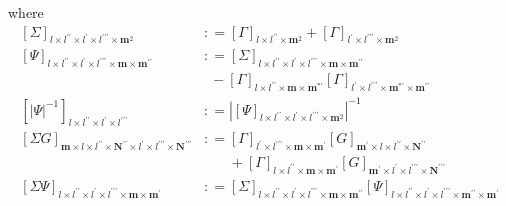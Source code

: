 \documentclass[preprint,12pt]{elsarticle}
\newcommand*{\M}[1]{\ensuremath{#1}\xspace}
\newcommand*{\x}{\times}
\newcommand*{\mi}[1]{\mathbf{#1}}
\newcommand*{\te}[2][]{\left\lbrack{#2}\right\rbrack_{#1}}
\newcommand*{\deq}{\M{\mathrel{\mathop:}=}}
\newcommand*{\modulus}[1]{\M{\left\lvert{#1}\right\rvert}}
\begin{document}
    where
    \begin{equation*}
        \begin{aligned}
            \te[l\x l^{\prime\prime}\x l^{\prime}\x l^{\prime\prime\prime}\x\mi{m}^{2}]{\Sigma} &\deq 
            \te[l\x l^{\prime\prime}\x\mi{m}^{2}]{\Gamma} + \te[l^{\prime}\x l^{\prime\prime\prime}\x\mi{m}^{2}]{\Gamma} \\
            \te[l\x l^{\prime\prime}\x l^{\prime}\x l^{\prime\prime\prime}\x\mi{m}\x\mi{m^{\prime\prime}}]{\Psi} &\deq 
            \te[l\x l^{\prime\prime}\x l^{\prime}\x l^{\prime\prime\prime}\x\mi{m}\x\mi{m^{\prime\prime}}]{\Sigma} \\
            &\phantom{:}- \te[l\x l^{\prime\prime}\x\mi{m}\x\mi{m^{*\prime}}]{\Gamma} \te[l^{\prime}\x l^{\prime\prime\prime}\x\mi{m^{*\prime}}\x\mi{m^{\prime\prime}}]{\Gamma} \\
            \te[l\x l^{\prime\prime}\x l^{\prime}\x l^{\prime\prime\prime}]{\modulus{\Psi}^{-1}} &\deq 
            \modulus{\te[l\x l^{\prime\prime}\x l^{\prime}\x l^{\prime\prime\prime}\x\mi{m}^{2}]{\Psi}}^{-1} \\
            \te[\mi{m}\x l\x l^{\prime\prime}\x\mi{N^{\prime\prime}}\x l^{\prime}\x l^{\prime\prime\prime}\x\mi{N^{\prime\prime\prime}}]{\Sigma G} &\deq 
            \te[l^{\prime}\x l^{\prime\prime\prime}\x\mi{m}\x\mi{m^{\prime}}]{\Gamma}
            \te[\mi{m^{\prime}}\x l\x l^{\prime\prime}\x\mi{N^{\prime\prime}}]{G}\\
            &\phantom{\deq}+
            \te[l\x l^{\prime\prime}\x\mi{m}\x\mi{m^{\prime}}]{\Gamma}
            \te[\mi{m^{\prime}}\x l^{\prime}\x l^{\prime\prime\prime}\x\mi{N^{\prime\prime\prime}}]{G}\\
            \te[l\x l^{\prime\prime}\x l^{\prime}\x l^{\prime\prime\prime}\x\mi{m}\x\mi{m^{\prime}}]{\Sigma\Psi} &\deq 
            \te[l\x l^{\prime\prime}\x l^{\prime}\x l^{\prime\prime\prime}\x\mi{m}\x\mi{m^{\prime\prime}}]{\Sigma}
            \te[l\x l^{\prime\prime}\x l^{\prime}\x l^{\prime\prime\prime}\x\mi{m^{\prime\prime}}\x\mi{m^{\prime}}]{\Psi}
        \end{aligned}                    
    \end{equation*}
\end{document}
